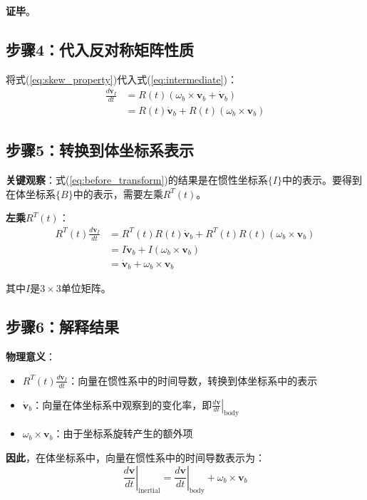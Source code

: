 \documentclass[12pt,a4paper]{article}
\begin{document}
\textbf{证毕}。

\subsection{步骤4：代入反对称矩阵性质}

将式(\ref{eq:skew_property})代入式(\ref{eq:intermediate})：
\begin{align}
\frac{d\bm{v}_I}{dt} &= R(t) (\omega_b \times \bm{v}_b + \dot{\bm{v}}_b) \\
&= R(t) \dot{\bm{v}}_b + R(t) (\omega_b \times \bm{v}_b)
\label{eq:before_transform}
\end{align}

\subsection{步骤5：转换到体坐标系表示}

\textbf{关键观察}：式(\ref{eq:before_transform})的结果是在惯性坐标系$\{I\}$中的表示。要得到在体坐标系$\{B\}$中的表示，需要左乘$R^T(t)$。

\textbf{左乘$R^T(t)$}：
\begin{align}
R^T(t) \frac{d\bm{v}_I}{dt} &= R^T(t) R(t) \dot{\bm{v}}_b + R^T(t) R(t) (\omega_b \times \bm{v}_b) \\
&= I \dot{\bm{v}}_b + I (\omega_b \times \bm{v}_b) \\
&= \dot{\bm{v}}_b + \omega_b \times \bm{v}_b
\label{eq:body_frame_result}
\end{align}

其中$I$是$3 \times 3$单位矩阵。

\subsection{步骤6：解释结果}

\textbf{物理意义}：

\begin{itemize}
\item $R^T(t) \frac{d\bm{v}_I}{dt}$：向量在惯性系中的时间导数，转换到体坐标系中的表示

\item $\dot{\bm{v}}_b$：向量在体坐标系中观察到的变化率，即$\left.\frac{d\bm{v}}{dt}\right|_{\text{body}}$

\item $\omega_b \times \bm{v}_b$：由于坐标系旋转产生的额外项
\end{itemize}

\textbf{因此}，在体坐标系中，向量在惯性系中的时间导数表示为：
\begin{equation}
\left.\frac{d\bm{v}}{dt}\right|_{\text{inertial}} = \left.\frac{d\bm{v}}{dt}\right|_{\text{body}} + \omega_b \times \bm{v}_b
\end{equation}
\end{document}
